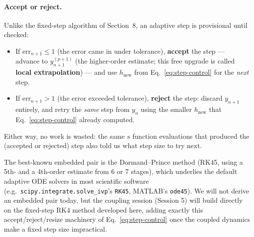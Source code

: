 \paragraph{Accept or reject.} Unlike the fixed-step algorithm of Section~8, an adaptive step is provisional until checked:
\begin{itemize}
\item If $\mathrm{err}_{n+1} \le 1$ (the error came in under tolerance), \textbf{accept} the step --- advance to $y_{n+1}^{(p+1)}$ (the higher-order estimate; this free upgrade is called \textbf{local extrapolation}) --- and use $h_{\mathrm{new}}$ from Eq.~\eqref{eq:step-control} for the \emph{next} step.
\item If $\mathrm{err}_{n+1} > 1$ (the error exceeded tolerance), \textbf{reject} the step: discard $y_{n+1}$ entirely, and retry the \emph{same} step from $y_n$ using the smaller $h_{\mathrm{new}}$ that Eq.~\eqref{eq:step-control} already computed.
\end{itemize}
Either way, no work is wasted: the same $s$ function evaluations that produced the (accepted or rejected) step also told us what step size to try next.

\begin{center}
\end{center}

The best-known embedded pair is the Dormand--Prince method (RK45, using a 5th- and a 4th-order estimate from 6 or 7 stages), which underlies the default adaptive ODE solvers in most scientific software (e.g.\ \texttt{scipy.integrate.solve\_ivp}'s \texttt{RK45}, MATLAB's \texttt{ode45}). We will not derive an embedded pair today, but the coupling session (Session 5) will build directly on the fixed-step RK4 method developed here, adding exactly this accept/reject/resize machinery of Eq.~\eqref{eq:step-control} once the coupled dynamics make a fixed step size impractical.

